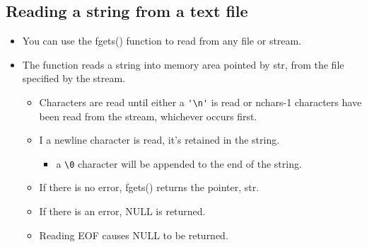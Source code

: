 \subsection{Reading a string from a text file}
\begin{itemize}
    \item You can use the fgets() function to read from any file or stream.
    
    \item The function reads a string into memory area pointed by str, from the file specified by the stream.
        \begin{itemize}
            \item Characters are read until either a \verb|'\n'| is read or nchars-1 characters have been read from the stream, whichever occurs first.
            \item I a newline character is read, it's retained in the string.
                \begin{itemize}
                    \item a \verb|\0| character will be appended to the end of the string.
                \end{itemize}
            
            \item If there is no error, fgets() returns the pointer, str.
            \item If there is an error, NULL is returned.
            \item Reading EOF causes NULL to be returned.
        \end{itemize}
\end{itemize}

